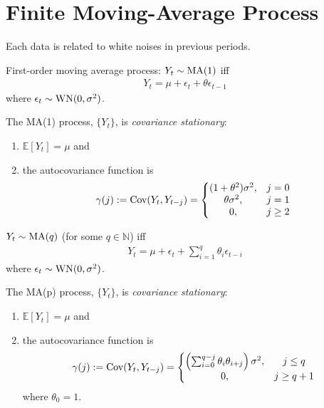 \documentclass[11pt]{elegantbook}
\begin{document}
\section{Finite Moving-Average Process}
Each data is related to white noises in previous periods.
\begin{definition}[MA(1)]
    First-order moving average process: $Y_t\sim \textnormal{MA}(1)$ iff
    \begin{equation}
        \begin{aligned}
            Y_t=\mu+\epsilon_t+\theta\epsilon_{t-1}
        \end{aligned}
        \nonumber
    \end{equation}
    where $\epsilon_t\sim \textnormal{WN}(0,\sigma^2)$.
\end{definition}
The MA(1) process, $\{Y_t\}$, is \textit{covariance stationary}:
\begin{enumerate}
    \item $\mathbb{E}[Y_t]=\mu$ and
    \item the autocovariance function is $$\gamma(j):=\textnormal{Cov}(Y_t,Y_{t-j})=\left\{\begin{matrix}
        (1+\theta^2)\sigma^2,&j=0\\
        \theta\sigma^2,&j=1\\
        0,&j\geq 2
    \end{matrix}\right.$$
\end{enumerate}
\begin{definition}[MA(p)]
    $Y_t\sim \textnormal{MA}(q)$ (for some $q\in \mathbb{N}$) iff
    \begin{equation}
        \begin{aligned}
            Y_t=\mu+\epsilon_t+\sum_{i=1}^{q}\theta_i\epsilon_{t-i}
        \end{aligned}
        \nonumber
    \end{equation}
    where $\epsilon_t\sim \textnormal{WN}(0,\sigma^2)$.
\end{definition}
The MA(p) process, $\{Y_t\}$, is \textit{covariance stationary}:
\begin{enumerate}
    \item $\mathbb{E}[Y_t]=\mu$ and
    \item the autocovariance function is $$\gamma(j):=\textnormal{Cov}(Y_t,Y_{t-j})=\left\{\begin{matrix}
        \left(\sum_{i=0}^{q-j}\theta_i\theta_{i+j}\right)\sigma^2,&j\leq q\\
        0,&j\geq q+1
    \end{matrix}\right.$$ where $\theta_0=1$.
\end{enumerate}
\end{document}
